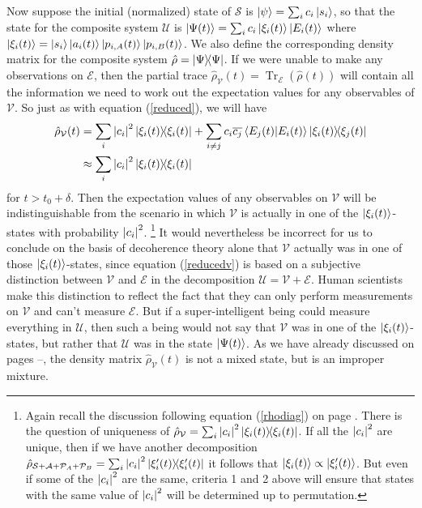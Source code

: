 \documentclass[letter, 12pt]{turabian-thesis}
\theoremstyle{hypothesis}
\let\origfootnote\footnote %
\renewcommand{\footnote}[1]{%
\noindent %
\origfootnote{#1}}
\renewcommand{\Tr}{\operatorname{Tr}}
\begin{document}
Now suppose the initial (normalized) state of $\mathcal{S}$ is $\ket{\psi}=\sum_i c_i\ket{s_i}$, so that the state for the composite system $\mathcal{U}$ is $\ket{\Psi(t)}=\sum_i c_i \ket{\xi_i(t)}\ket{E_i(t)}$ where $\ket{\xi_i(t)}=\ket{s_i}\ket{a_i(t)}\ket{p_{i,A}(t)}\ket{p_{i,B}(t)}$. We also define the corresponding density matrix for the composite system $\hat{\rho}=\dyad{\Psi}$. If we were unable to make any observations on $\mathcal{E}$, then 
 the partial trace
$\hat{\rho}_{\mathcal{V}}(t)=\Tr_\mathcal{E}(\hat{\rho}(t))$ will contain all the information we need to work out the expectation values for any observables of  $\mathcal{V}.$ So just as with equation (\ref{reduced}), we will have
\begin{equation} \label{reducedv}
\begin{split}
  \hat{\rho}_{\mathcal{V}}(t)&=\sum_{i}\abs{c_i}^2\dyad{\xi_i(t)}+\sum_{i\neq j}c_i\overline{c_j}\ip{E_j(t)}{E_i(t)}\dyad{\xi_i(t)}{\xi_j(t)}\\
  &\approx \sum_{i}\abs{c_i}^2\dyad{\xi_i(t)}
  \end{split}\end{equation}
  for $t>t_0+\delta.$ Then the expectation values of any observables on $\mathcal{V}$ will be indistinguishable from the scenario in which $\mathcal{V}$ is actually in one of the $\ket{\xi_i(t)}$-states with probability $\abs{c_i}^2$.\footnote{Again recall the discussion following equation (\ref{rhodiag}) on page \pageref{rhodiag}. There is the question of uniqueness of $\hat{\rho}_{\mathcal{V}}=\sum_{i}\abs{c_i}^2\dyad{\xi_i(t)}$. If all the $\abs{c_i}^2$ are unique, then if we have another decomposition $\hat{\rho}_{\mathcal{S}+\mathcal{A}+\mathcal{P}_A+\mathcal{P}_B}=\sum_{i}\abs{c_i}^2\dyad{\xi_i'(t)}$ it follows that $\ket{\xi_i(t)}\propto\ket{\xi_i'(t)}$. But even if some of the $\abs{c_i}^2$ are the same, criteria 1 and 2 above will ensure that states with the same  value of $\abs{c_i}^2$ will be determined up to permutation.} It would nevertheless be incorrect for us to conclude on the basis of decoherence theory alone that $\mathcal{V}$ actually was in one of those $\ket{\xi_i(t)}$-states, since equation (\ref{reducedv}) is based on a subjective distinction between $\mathcal{V}$ and $\mathcal{E}$ in the decomposition $\mathcal{U}=\mathcal{V}+\mathcal{E}.$ Human scientists make this distinction to reflect the fact that they can only perform measurements on $\mathcal{V}$ and can't measure $\mathcal{E}$. But if a super-intelligent being could measure everything in  $\mathcal{U}$, then such a being would not say that $\mathcal{V}$ was in one of the  $\ket{\xi_i(t)}$-states, but rather that $\mathcal{U}$ was in the state $\ket{\Psi(t)}$. As we have already discussed on pages \pageref{subtle}--\pageref{subtleend}, the density matrix $ \hat{\rho}_{\mathcal{V}}(t)$ is not a mixed state, but is an improper mixture. 
\end{document}
